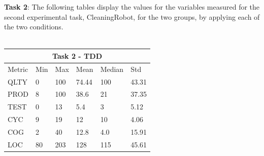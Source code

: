 \noindent \textbf{Task 2}: The following tables display the values for the variables measured for the second experimental task, CleaningRobot, for the two groups, by applying each of the two conditions.
\\ \  \\
\noindent
\begin{tabular}{ |p{2cm}||p{1.6cm}|p{1.6cm}|p{1.6cm}|p{1.6cm}|p{1.6cm}|}
    \hline
        \multicolumn{6}{|c|}{Task 2 - TDD} \\
    \hline
        Metric & Min & Max & Mean & Median & Std\\
    \hline
        QLTY & 0 & 100 & 74.44 & 100 & 43.31 \\
        PROD & 8 & 100 & 38.6 & 21 & 37.35 \\
        TEST & 0 & 13 & 5.4 & 3 & 5.12 \\
        CYC & 9 & 19 & 12 & 10 & 4.06 \\
        COG & 2 & 40 & 12.8 & 4.0 & 15.91 \\
        LOC & 80 & 203 & 128 & 115 & 45.61 \\
    \hline
\end{tabular}

